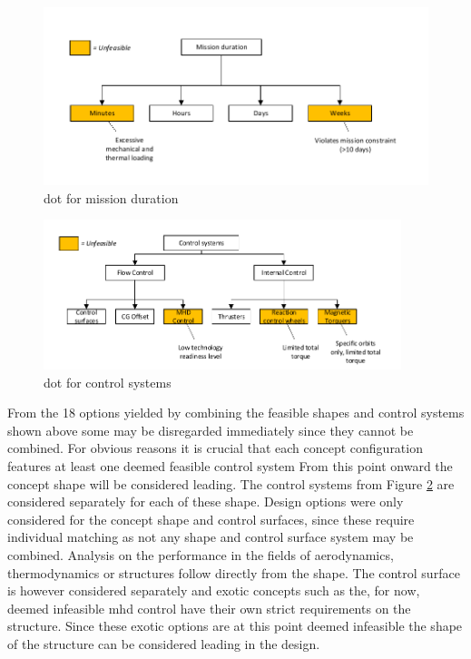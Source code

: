 \begin{figure}[H]
\centering
\includegraphics[width = 1.0\textwidth]{Figure/DOT_missionduration.pdf}
\vspace{-5mm}
\caption{\acrlong{dot} for mission duration}
\label{fig:dotduration}
\end{figure}

\begin{figure}[H]
\centering
\includegraphics[width = 0.93\textwidth]{Figure/DOT_control.pdf}
\vspace{-5mm}
\caption{\acrlong{dot} for control systems}
\label{fig:dotcontrol}
\end{figure}


From the 18 options yielded by combining the feasible shapes and control systems shown above some may be disregarded immediately since they cannot be combined. For obvious reasons it is crucial that each concept configuration features at least one deemed feasible control system From this point onward the concept shape will be considered leading. The control systems from Figure \ref{fig:dotcontrol} are considered separately for each of these shape. Design options were only considered for the concept shape and control surfaces, since these require individual matching as not any shape and control surface system may be combined. Analysis on the performance in the fields of aerodynamics, thermodynamics or structures follow directly from the shape. The control surface is however considered separately and exotic concepts such as the, for now, deemed infeasible \gls{mhd} control have their own strict requirements on the structure. Since these exotic options are at this point deemed infeasible the shape of the structure can be considered leading in the design. 

